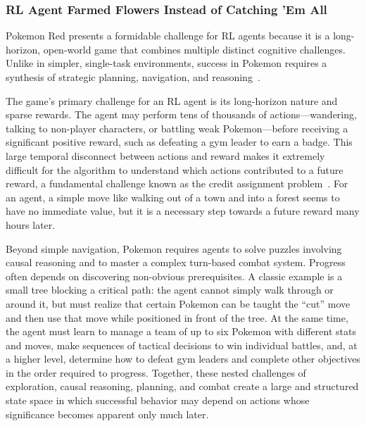 \subsubsection{RL Agent Farmed Flowers Instead of Catching 'Em All~\citep{PokemonRedExperiments}}
\label{sec:pokemon}


Pokemon Red presents a formidable challenge for RL agents because it is a long-horizon, open-world game that combines multiple distinct cognitive challenges. Unlike in simpler, single-task environments, success in Pokemon requires a synthesis of strategic planning, navigation, and reasoning~\citep{pleines2025pokemonredreinforcementlearning, karten2026pokeagentchallengecompetitivelongcontext, rubinstein2025pokerl, jain2025largelanguagemodelspokemon}.

The game's primary challenge for an RL agent is its long-horizon nature and sparse rewards. The agent may perform tens of thousands of actions---wandering, talking to non-player characters, or battling weak Pokemon---before receiving a significant positive reward, such as defeating a gym leader to earn a badge. This large temporal disconnect between actions and reward makes it extremely difficult for the algorithm to understand which actions contributed to a future reward, a fundamental challenge known as the credit assignment problem~\citep{sutton2018reinforcement}. For an agent, a simple move like walking out of a town and into a forest seems to have no immediate value, but it is a necessary step towards a future reward many hours later.

Beyond simple navigation, Pokemon requires agents to solve puzzles involving causal reasoning and to master a complex turn-based combat system. Progress often depends on discovering non-obvious prerequisites. A classic example is a small tree blocking a critical path: the agent cannot simply walk through or around it, but must realize that certain Pokemon can be taught the ``cut'' move and then use that move while positioned in front of the tree. At the same time, the agent must learn to manage a team of up to six Pokemon with different stats and moves, make sequences of tactical decisions to win individual battles, and, at a higher level, determine how to defeat gym leaders and complete other objectives in the order required to progress. Together, these nested challenges of exploration, causal reasoning, planning, and combat create a large and structured state space in which successful behavior may depend on actions whose significance becomes apparent only much later.

